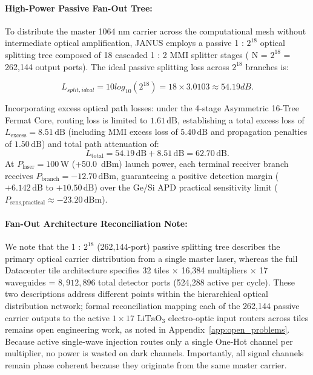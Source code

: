 \documentclass[journal]{IEEEtran}
\begin{document}
\paragraph{\textbf{High-Power Passive Fan-Out Tree:}}

To distribute the master 1064 nm carrier across the computational mesh without intermediate optical amplification, JANUS employs a passive
1 : $2^{18}$ optical splitting tree composed of 18 cascaded 1 : 2 MMI splitter stages ( N = $2^{18}$ = 262,144 output ports). The ideal passive splitting loss across $2^{18}$ branches is:

\begin{equation}
L_{split,ideal} = 10 log_{10}(2^{18}) = 18 \times 3.0103 \approx 54.19 dB.
\end{equation}

Incorporating excess optical path losses: under the 4-stage Asymmetric 16-Tree Fermat Core, routing loss is limited to $1.61\,\text{dB}$, establishing a total excess loss of $L_{\text{excess}} = 8.51\,\text{dB}$ (including MMI excess loss of $5.40\,\text{dB}$ and propagation penalties of $1.50\,\text{dB}$) and total path attenuation of:
\begin{equation}
L_{\text{total}} = 54.19\,\text{dB} + 8.51\,\text{dB} = 62.70\,\text{dB}.
\end{equation}
At $P_{\text{laser}} = 100\,\text{W}$ (+50.0~dBm) launch power, each terminal receiver branch receives $P_{\text{branch}} = -12.70\,\text{dBm}$, guaranteeing a positive detection margin ($+6.142\,\mathrm{dB}$ to $+10.50\,\mathrm{dB}$) over the Ge/Si APD practical sensitivity limit ($P_{\text{sens,practical}} \approx -23.20\,\text{dBm}$).

\paragraph{\textbf{Fan-Out Architecture Reconciliation Note:}}

We note that the 1 : $2^{18}$ (262,144-port) passive splitting tree describes the primary optical carrier distribution from a single master laser, whereas the full Datacenter tile architecture specifies 32 tiles $\times$ 16,384 multipliers $\times$ 17 waveguides = $8{,}912{,}896$ total detector ports (524,288 active per cycle). These two descriptions address different points within the hierarchical optical distribution network; formal reconciliation mapping each of the 262,144 passive carrier outputs to the active $1 \times 17$ $\mathrm{LiTaO_3}$ electro-optic input routers across tiles remains open engineering work, as noted in Appendix~\ref{app:open_problems}. Because active single-wave injection routes only a single One-Hot channel per multiplier, no power is wasted on dark channels. Importantly, all signal channels remain phase coherent because they originate from the same master carrier.
\end{document}
